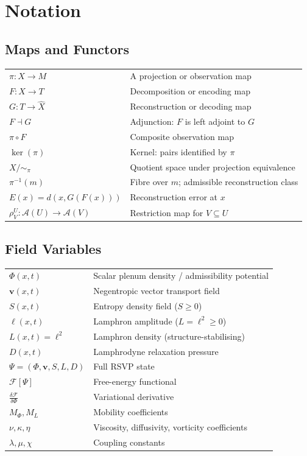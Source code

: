 
\chapter*{Notation}

\section*{Maps and Functors}

\begin{tabular}{@{}lp{9cm}}
$\pi : X \to M$ & A projection or observation map \\
$F : X \to T$ & Decomposition or encoding map \\
$G : T \to \hat{X}$ & Reconstruction or decoding map \\
$F \dashv G$ & Adjunction: $F$ is left adjoint to $G$ \\
$\pi \circ F$ & Composite observation map \\
$\ker(\pi)$ & Kernel: pairs identified by $\pi$ \\
$X / {\sim_\pi}$ & Quotient space under projection equivalence \\
$\pi^{-1}(m)$ & Fibre over $m$; admissible reconstruction class \\
$E(x) = d(x, G(F(x)))$ & Reconstruction error at $x$ \\
$\rho^U_V : \mathcal{A}(U) \to \mathcal{A}(V)$ & Restriction map for $V \subseteq U$ \\
\end{tabular}

\section*{Field Variables}

\begin{tabular}{@{}lp{9cm}}
$\Phi(x,t)$ & Scalar plenum density / admissibility potential \\
$\mathbf{v}(x,t)$ & Negentropic vector transport field \\
$S(x,t)$ & Entropy density field ($S \geq 0$) \\
$\ell(x,t)$ & Lamphron amplitude ($L = \ell^2 \geq 0$) \\
$L(x,t) = \ell^2$ & Lamphron density (structure-stabilising) \\
$D(x,t)$ & Lamphrodyne relaxation pressure \\
$\Psi = (\Phi, \mathbf{v}, S, L, D)$ & Full RSVP state \\
$\mathcal{F}[\Psi]$ & Free-energy functional \\
$\frac{\delta \mathcal{F}}{\delta \Phi}$ & Variational derivative \\
$M_\Phi, M_L$ & Mobility coefficients \\
$\nu, \kappa, \eta$ & Viscosity, diffusivity, vorticity coefficients \\
$\lambda, \mu, \chi$ & Coupling constants \\
\end{tabular}


